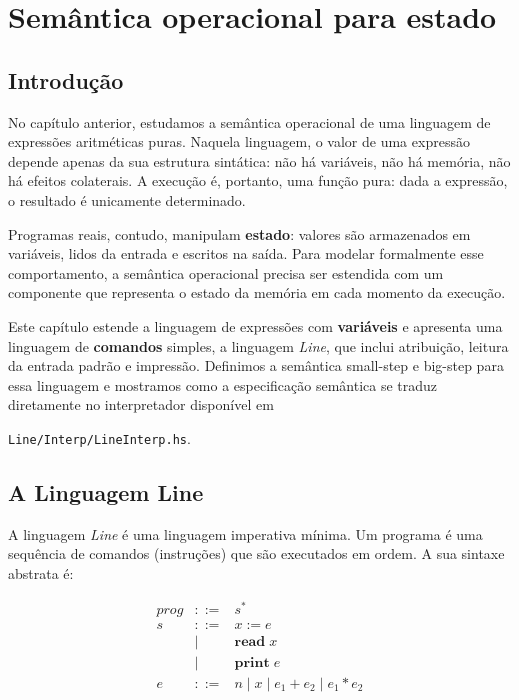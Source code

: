 \chapter{Semântica operacional para estado}

\section{Introdução}

No capítulo anterior, estudamos a semântica operacional de uma
linguagem de expressões aritméticas puras. Naquela linguagem, o valor
de uma expressão depende apenas da sua estrutura sintática: não há
variáveis, não há memória, não há efeitos colaterais. A execução é,
portanto, uma função pura: dada a expressão, o resultado é unicamente
determinado.

Programas reais, contudo, manipulam \textbf{estado}: valores são
armazenados em variáveis, lidos da entrada e escritos na saída. Para
modelar formalmente esse comportamento, a semântica operacional
precisa ser estendida com um componente que representa o estado da
memória em cada momento da execução.

Este capítulo estende a linguagem de expressões com
\textbf{variáveis} e apresenta uma linguagem de \textbf{comandos}
simples, a linguagem \emph{Line},  que inclui atribuição,
leitura da entrada padrão e impressão. Definimos a semântica
small-step e big-step para essa linguagem e mostramos como a
especificação semântica se traduz diretamente no interpretador
disponível em
\begin{flushleft}
  \verb|Line/Interp/LineInterp.hs|.
\end{flushleft}

\section{A Linguagem Line}

A linguagem \emph{Line} é uma linguagem imperativa mínima. Um
programa é uma sequência de comandos (instruções) que são executados
em ordem. A sua sintaxe abstrata é:

\[
  \begin{array}{lcl}
    \mathit{prog} & ::= & s^*\\
    s & ::= & x \mathbin{:=} e \\
    & \mid & \mathbf{read}\; x \\
    & \mid & \mathbf{print}\; e\\
    e & ::= & n \mid x \mid e_1 + e_2 \mid e_1 * e_2
  \end{array}
\]

